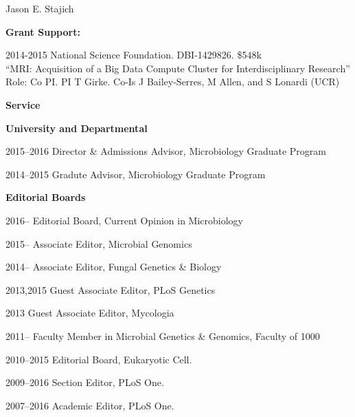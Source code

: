 \documentclass[10pt]{article}
\begin{document}
\begin{cv}{\centerline{Jason E. Stajich}}
\begin{cvlistcompact}{\bf Grant Support:}
\item [2014-2015] National Science Foundation. DBI-1429826. \$548k \\
``MRI: Acquisition of a Big Data Compute Cluster for Interdisciplinary
  Research''
Role: Co PI. PI T Girke. Co-Is J Bailey-Serres, M Allen, and S Lonardi (UCR)

\setlength{\cvlabelwidth}{18mm}

\begin{cvlistcompact}{\bf Service}
\item[{\bf University and Departmental}]
\item [2015--2016] Director \& Admissions Advisor, Microbiology Graduate Program
\item [2014--2015] Gradute Advisor, Microbiology Graduate Program
  \\  
\item[{\bf Editorial Boards}]
\item [2016--] Editorial Board, Current Opinion in Microbiology
\item [2015--] Associate Editor, Microbial Genomics
\item [2014--] Associate Editor, Fungal Genetics \& Biology
\item [2013,2015] Guest Associate Editor, PLoS Genetics
\item [2013] Guest Associate Editor, Mycologia
\item [2011--] Faculty Member in Microbial Genetics \& Genomics,
  Faculty of 1000
\item [2010--2015] Editorial Board, Eukaryotic Cell.
\item [2009--2016] Section Editor, PLoS One.
\item [2007--2016] Academic Editor, PLoS One.
\\
  

\end{cvlistcompact}
\end{cvlistcompact}
\end{cv}
\end{document}
